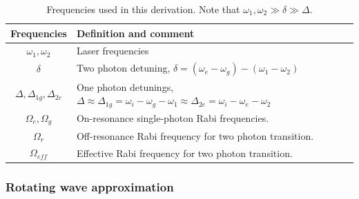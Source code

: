 \begin{table}[h!]
\centering
\begin{tabular}{|c|l|}
\hline
Frequencies & Definition and comment \\ \hline \hline
$\omega_1,\omega_2$& Laser frequencies\\ \hline
$\delta$ & Two photon detuning, $\delta=(\omega_e-\omega_g)-(\omega_1-\omega_2)$\\ \hline
$\Delta,\Delta_{1g},\Delta_{2e}$& One photon detunings, $\Delta\approx\Delta_{1g}=\omega_i-\omega_g-\omega_1\approx
\Delta_{2e}=\omega_i-\omega_e-\omega_2$\\ \hline
$\Omega_{e},\Omega_{g}$ & On-resonance single-photon Rabi frequencies. \\ \hline
$\Omega_{r}$ & Off-resonance Rabi frequency for two photon transition.\\ \hline
$\Omega_{\mathit{eff}}$ & Effective Rabi frequency for two photon transition.\\ \hline
\end{tabular}
\caption{Frequencies used in this derivation. Note that $\omega_1,\omega_2\gg \delta \gg \Delta$. }
\label{frequencyTable}
\end{table}

\subsubsection{Rotating wave approximation}

